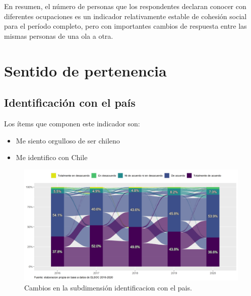 \documentclass[
  12pt,
]{book}
\begin{document}
En resumen, el número de personas que los respondentes declaran conocer con diferentes ocupaciones es un indicador relativamente estable de cohesión social para el período completo, pero con importantes cambios de respuesta entre las mismas personas de una ola a otra.

\hypertarget{sentido-de-pertenencia-1}{%
\section{Sentido de pertenencia}\label{sentido-de-pertenencia-1}}

\hypertarget{identificaciuxf3n-con-el-pauxeds}{%
\subsection{Identificación con el país}\label{identificaciuxf3n-con-el-pauxeds}}

Los ítems que componen este indicador son:

\begin{itemize}
\item
  Me siento orgulloso de ser chileno
\item
  Me identifico con Chile
\end{itemize}

\begin{figure}[H]

{\centering \includegraphics[width=1\linewidth,height=1\textheight]{output/graphs/alluvial_identificacion} 

}

\caption{Cambios en la subdimensión identificacion con el pais.}\label{fig:alluvial-identificacion}
\end{figure}
\end{document}
